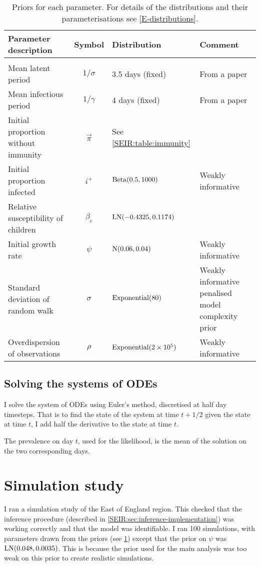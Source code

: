 \documentclass[thesis.tex]{subfiles}
\begin{document}
\begin{landscape}
\begin{table}
\begin{tabular}{l c l l}
    Parameter description & Symbol & Distribution & Comment \\
    \hline \\
    Mean latent period & $1/\sigma$ & 3.5 days (fixed) & From a paper \\
    Mean infectious period & $1/\gamma$ & 4 days (fixed) & From a paper \\
    Initial proportion without immunity & $\vec\pi$ & See \cref{SEIR:table:immunity} & \\
    Initial proportion infected & $i^+$ & $\operatorname{Beta}(0.5, 1000)$ & Weakly informative \\
    Relative susceptibility of children & $\beta_c$ & $\operatorname{LN}(-0.4325, 0.1174)$ &  \\
    Initial growth rate & $\psi$ & $\operatorname{N}(0.06, 0.04)$ & Weakly informative \\
    Standard deviation of random walk & $\sigma$ & $\operatorname{Exponential}(80)$ & Weakly informative penalised model complexity prior~\autocite{simpsonPenalising} \\
    Overdispersion of observations & $\rho$ & $\operatorname{Exponential}(2 \times 10^5)$ & Weakly informative
\end{tabular}
\caption[SEIR model priors]{Priors for each parameter. For details of the distributions and their parameterisations see \cref{E-distributions}.}
\label{SEIR:table:priors}
\end{table}
\end{landscape}

\subsection{Solving the systems of ODEs}
I solve the system of ODEs using Euler's method, discretised at half day timesteps.
That is to find the state of the system at time $t+1/2$ given the state at time $t$, I add half the derivative to the state at time $t$.

The prevalence on day $t$, used for the likelihood, is the mean of the solution on the two corresponding days.

\section{Simulation study} \label{SEIR:sec:sim-study}
I ran a simulation study of the East of England region.
This checked that the inference procedure (described in \cref{SEIR:sec:inference-implementation}) was working correctly and that the model was identifiable.
I ran 100 simulations, with parameters drawn from the priors (see \cref{SEIR:table:priors}) except that the prior on $\psi$ was $\operatorname{LN}(0.048, 0.0035)$.
This is because the prior used for the main analysis was too weak on this prior to create realistic simulations.
\end{document}
